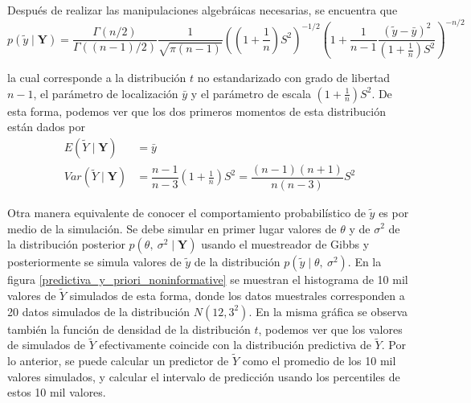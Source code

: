 \documentclass[10pt,openright]{book}\usepackage[]{graphicx}\usepackage[]{color}
\begin{document}
Despu\'es de realizar las manipulaciones algebr\'aicas necesarias, se encuentra que 
\begin{equation}\label{post_y_no_informativa_t_student}
p(\tilde{y}\mid\mathbf{Y})=\dfrac{\Gamma(n/2)}{\Gamma((n-1)/2)}\dfrac{1}{\sqrt{\pi(n-1)}}\left(\left(1+\frac{1}{n}\right)S^2\right)^{-1/2}\left(1+\dfrac{1}{n-1}\dfrac{(\tilde{y}-\bar{y})^2}{\left(1+\frac{1}{n}\right)S^2}\right)^{-n/2}
\end{equation}

la cual corresponde a la distribuci\'on $t$ no estandarizado con grado de libertad $n-1$, el par\'ametro de localizaci\'on $\bar{y}$ y el par\'ametro de escala $(1+\frac{1}{n})S^2$. De esta forma, podemos ver que los dos primeros momentos de esta distribuci\'on est\'an dados por
\begin{align*}
E(\tilde{Y}\mid\mathbf{Y})&=\bar{y}\\
Var(\tilde{Y}\mid\mathbf{Y})&=\dfrac{n-1}{n-3}\left(1+\frac{1}{n}\right)S^2=\dfrac{(n-1)(n+1)}{n(n-3)}S^2
\end{align*}

Otra manera equivalente de conocer el comportamiento probabil\'istico de $\tilde{y}$ es por medio de la simulaci\'on. Se debe simular en primer lugar valores de $\theta$ y de $\sigma^2$ de la distribuci\'on posterior $p(\theta,\ \sigma^2\mid\mathbf{Y})$ usando el muestreador de Gibbs y posteriormente se simula valores de $\tilde{y}$ de la distribuci\'on $p(\tilde{y}\mid\theta,\ \sigma^2)$. En la figura \ref{predictiva_y_priori_noninformative} se muestran el histograma de 10 mil valores de $\tilde{Y}$ simulados de esta forma, donde los datos muestrales corresponden a 20 datos simulados de la distribuci\'on $N(12,3^2)$. En la misma gr\'afica se observa tambi\'en la funci\'on de densidad de la distribuci\'on $t$, podemos ver que los valores de simulados de $\tilde{Y}$ efectivamente coincide con la distribuci\'on predictiva de $\tilde{Y}$. Por lo anterior, se puede calcular un predictor de $\tilde{Y}$ como el promedio de los 10 mil valores simulados, y calcular el intervalo de predicci\'on usando los percentiles de estos 10 mil valores.
 
\end{document}
